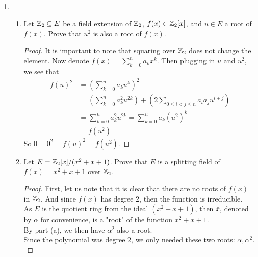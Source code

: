 \documentclass[12pt]{article}
\begin{document}
\begin{enumerate}
\begin{proof}
			For the field extension $F(f(x)) \subseteq F(x)$, we can just consider the indeterminate $x$ being algebraic, since adjoining $x$ generates the whole field $F(x)$. This is because any rational function with coefficients in $F$ is also a rational function with coefficients in $F(f(x))$.\\
			Now to find a polynomial with coefficients in $F(f(x))$ s.t. $x$ is a root. With $T$ being a temporary (meta) indeterminate, let our polynomial be $f(T) - f(x) \in F(f(x))[T]$. We can see that $x$ is a root of the polynomial, making $x$ algebraic. So the field extension $F(f(x)) \subseteq F(x)$ is algebraic.
		\end{proof}
		
		\item 
		\begin{enumerate} 
			\item Let $\mathbb{Z}_2 \subseteq E$ be a field extension of $\mathbb{Z}_2$, $f(x) \in \mathbb{Z}_2[x]$, and $u \in E$ a root of $f(x)$. Prove that $u^2$ is also a root of $f(x)$.
			\begin{proof}
				It is important to note that squaring over $\mathbb{Z}_2$ does not change the element. Now denote $f(x) = \sum_{k=0}^{n} a_k x^k$. Then plugging in $u$ and $u^2$, we see that
				\begin{align*}
					f(u)^2 &= \left(\sum_{k=0}^{n} a_k u^k\right)^2 \\
					&= \left(\sum_{k=0}^{n} a_k^2 u^{2k}\right) + \left(2 \sum_{0\leq i < j \leq n} a_ia_j u^{i+j}\right) \\
					&= \sum_{k=0}^{n} a_k^2 u^{2k} = \sum_{k=0}^{n} a_k (u^2)^k \\
					&= f(u^2)
				\end{align*}
				So $0 = 0^2 = f(u)^2 = f(u^2)$.
			\end{proof}
			\item Let $E = \mathbb{Z}_2[x]/(x^2 + x + 1)$. Prove that $E$ is a splitting field of $f(x) = x^2 + x + 1$ over $\mathbb{Z}_2$.
			\begin{proof}
				First, let us note that it is clear that there are no roots of $f(x)$ in $\mathbb{Z}_2$. And since $f(x)$ has degree 2, then the function is irreducible.\\
				As $E$ is the quotient ring from the ideal $(x^2+x+1)$, then $\bar{x}$, denoted by $\alpha$ for convenience, is a "root" of the function $x^2+x+1$.\\
				By part (a), we then have $\alpha^2$ also a root.\\
				Since the polynomial was degree 2, we only needed these two roots: $\alpha, \alpha^2$.\\

\end{proof}
\end{enumerate}
\end{enumerate}
\end{document}

